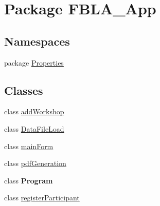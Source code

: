 \hypertarget{namespace_f_b_l_a___app}{\section{Package F\+B\+L\+A\+\_\+\+App}
\label{namespace_f_b_l_a___app}
}
\subsection*{Namespaces}
\begin{DoxyCompactItemize}
\item 
package \hyperlink{namespace_f_b_l_a___app_1_1_properties}{Properties}
\end{DoxyCompactItemize}
\subsection*{Classes}
\begin{DoxyCompactItemize}
\item 
class \hyperlink{class_f_b_l_a___app_1_1add_workshop}{add\+Workshop}
\item 
class \hyperlink{class_f_b_l_a___app_1_1_data_file_load}{Data\+File\+Load}
\item 
class \hyperlink{class_f_b_l_a___app_1_1main_form}{main\+Form}
\item 
class \hyperlink{class_f_b_l_a___app_1_1pdf_generation}{pdf\+Generation}
\item 
class {\bfseries Program}
\item 
class \hyperlink{class_f_b_l_a___app_1_1register_participant}{register\+Participant}
\end{DoxyCompactItemize}
